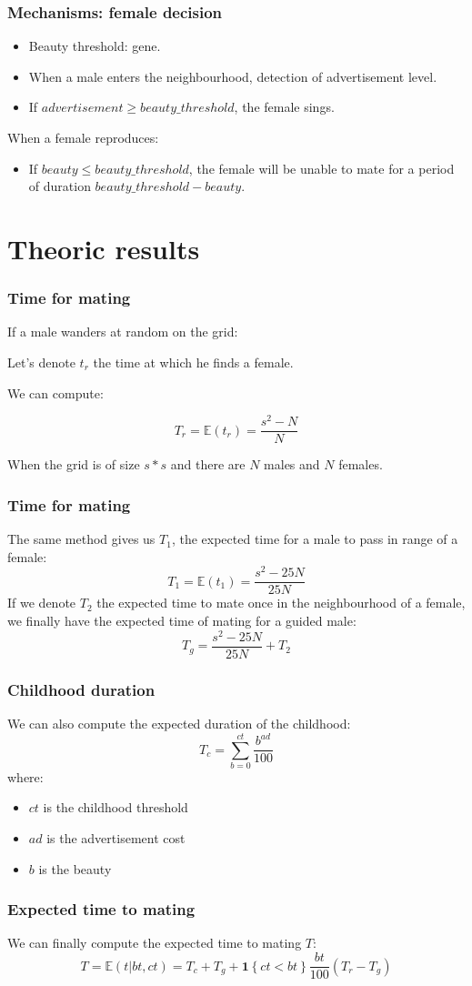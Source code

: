 \documentclass{beamer}
\begin{document}
\begin{frame}
\frametitle{Mechanisms: female decision}
\begin{itemize}
\item Beauty threshold: gene.
\item When a male enters the neighbourhood, detection of advertisement level.
\item If $advertisement \geq beauty\_threshold$, the female sings.
\end{itemize}
When a female reproduces:
\begin{itemize}
\item If $beauty \leq beauty\_threshold$, the female will be unable to mate for a period of duration $beauty\_threshold - beauty$.
\end{itemize}
\end{frame}

\section{Theoric results}

\begin{frame}
\frametitle{Time for mating}
If a male wanders at random on the grid:

Let's denote $t_r$ the time at which he finds a female.

We can compute:

$$T_r = \mathbb{E}(t_r) = \frac{s^2 - N}{N}$$

When the grid is of size $s*s$ and there are $N$ males and $N$ females.
\end{frame}

\begin{frame}
\frametitle{Time for mating}
The same method gives us $T_1$, the expected time for a male to pass in range of a female:
$$T_1 = \mathbb{E}(t_1) = \frac{s^2 - 25 N}{25 N}$$
If we denote $T_2$ the expected time to mate once in the neighbourhood of a female, we finally have the expected time of mating for a guided male:
$$T_g  = \frac{s^2 - 25N}{25 N} + T_2$$
\end{frame}

\begin{frame}
\frametitle{Childhood duration}
We can also compute the expected duration of the childhood:
$$T_c = \sum_{b=0}^{ct} \frac{b^{ad}}{100}$$
where:
\begin{itemize}
\item $ct$ is the childhood threshold
\item $ad$ is the advertisement cost
\item $b$ is the beauty
\end{itemize}
\end{frame}

\begin{frame}
\frametitle{Expected time to mating}
We can finally compute the expected time to mating $T$:
$$T = \mathbb{E}(t|bt,ct) = T_c + T_g + \textbf{1}\left\{ct < bt\right\}\frac{bt}{100} (T_r - T_g)$$
\end{frame}

\end{document}
